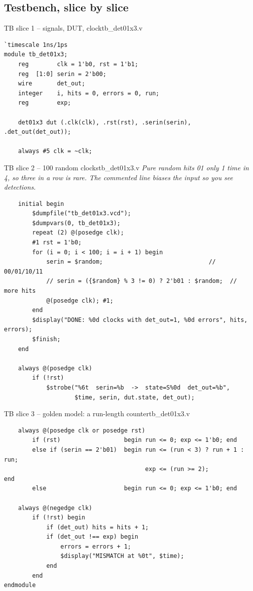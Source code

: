\documentclass[10pt,a4paper]{article}
\newcommand{\slicenote}[1]{{\small\color{black!70}\itshape #1}\par\smallskip}
\begin{document}
\subsection{Testbench, slice by slice}
\begin{codeslice}{TB slice 1 -- signals, DUT, clock}{tb\_det01x3.v}
\begin{lstlisting}
`timescale 1ns/1ps
module tb_det01x3;
    reg        clk = 1'b0, rst = 1'b1;
    reg  [1:0] serin = 2'b00;
    wire       det_out;
    integer    i, hits = 0, errors = 0, run;
    reg        exp;

    det01x3 dut (.clk(clk), .rst(rst), .serin(serin), .det_out(det_out));

    always #5 clk = ~clk;
\end{lstlisting}
\end{codeslice}
\begin{codeslice}{TB slice 2 -- 100 random clocks}{tb\_det01x3.v}
\slicenote{Pure random hits 01 only 1 time in 4, so three in a row is rare. The commented line biases the input so you see detections.}
\begin{lstlisting}
    initial begin
        $dumpfile("tb_det01x3.vcd");
        $dumpvars(0, tb_det01x3);
        repeat (2) @(posedge clk);
        #1 rst = 1'b0;
        for (i = 0; i < 100; i = i + 1) begin
            serin = $random;                              // 00/01/10/11
            // serin = ({$random} % 3 != 0) ? 2'b01 : $random;  // more hits
            @(posedge clk); #1;
        end
        $display("DONE: %0d clocks with det_out=1, %0d errors", hits, errors);
        $finish;
    end

    always @(posedge clk)
        if (!rst)
            $strobe("%6t  serin=%b  ->  state=S%0d  det_out=%b",
                    $time, serin, dut.state, det_out);
\end{lstlisting}
\end{codeslice}
\begin{codeslice}{TB slice 3 -- golden model: a run-length counter}{tb\_det01x3.v}
\begin{lstlisting}
    always @(posedge clk or posedge rst)
        if (rst)                  begin run <= 0; exp <= 1'b0; end
        else if (serin == 2'b01)  begin run <= (run < 3) ? run + 1 : run;
                                        exp <= (run >= 2);              end
        else                      begin run <= 0; exp <= 1'b0; end

    always @(negedge clk)
        if (!rst) begin
            if (det_out) hits = hits + 1;
            if (det_out !== exp) begin
                errors = errors + 1;
                $display("MISMATCH at %0t", $time);
            end
        end
endmodule
\end{lstlisting}
\end{codeslice}
\end{document}
